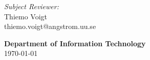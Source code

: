 \begin{titlepage}
\vspace{.5in}
\begin{minipage}{.97\textwidth}
    \begin{flushleft}
        \textit{Subject Reviewer:} \\
        Thiemo Voigt \\
        thiemo.voigt@angstrom.uu.se \\
    \end{flushleft}
\end{minipage}

\vspace{.5in}

\textbf{\large Department of Information Technology} \\

\today

\end{titlepage}

\newpage
